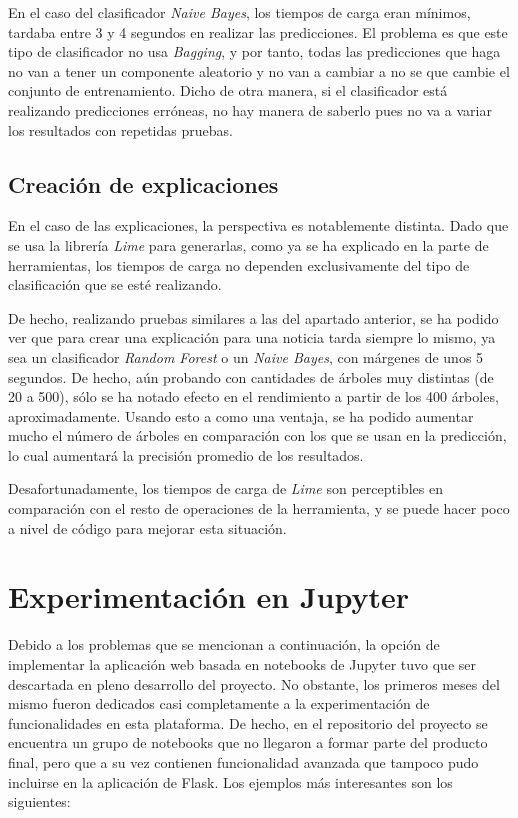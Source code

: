 En el caso del clasificador \emph{Naive Bayes}, los tiempos de carga eran mínimos, tardaba entre 3 y 4 segundos en realizar las predicciones. El problema es que este tipo de clasificador no usa \emph{Bagging}, y por tanto, todas las predicciones que haga no van a tener un componente aleatorio y no van a cambiar a no se que cambie el conjunto de entrenamiento. Dicho de otra manera, si el clasificador está realizando predicciones erróneas, no hay manera de saberlo pues no va a variar los resultados con repetidas pruebas.

\subsection{Creación de explicaciones}

En el caso de las explicaciones, la perspectiva es notablemente distinta. Dado que se usa la librería \emph{Lime} para generarlas, como ya se ha explicado en la parte de herramientas, los tiempos de carga no dependen exclusivamente del tipo de clasificación que se esté realizando. 

De hecho, realizando pruebas similares a las del apartado anterior, se ha podido ver que para crear una explicación para una noticia tarda siempre lo mismo, ya sea un clasificador \emph{Random Forest} o un \emph{Naive Bayes}, con márgenes de unos 5 segundos. De hecho, aún probando con cantidades de árboles muy distintas (de 20 a 500), sólo se ha notado efecto en el rendimiento a partir de los 400 árboles, aproximadamente. Usando esto a como una ventaja, se ha podido aumentar mucho el número de árboles en comparación con los que se usan en la predicción, lo cual aumentará la precisión promedio de los resultados.

Desafortunadamente, los tiempos de carga de \emph{Lime} son perceptibles en comparación con el resto de operaciones de la herramienta, y se puede hacer poco a nivel de código para mejorar esta situación.

\section{Experimentación en Jupyter}

Debido a los problemas que se mencionan a continuación, la opción de implementar la aplicación web basada en notebooks de Jupyter tuvo que ser descartada en pleno desarrollo del proyecto.
No obstante, los primeros meses del mismo fueron dedicados casi completamente a la experimentación de funcionalidades en esta plataforma. De hecho, en el repositorio del proyecto se encuentra un grupo de notebooks que no llegaron a formar parte del producto final, pero que a su vez contienen funcionalidad avanzada que tampoco pudo incluirse en la aplicación de Flask. Los ejemplos más interesantes son los siguientes:

